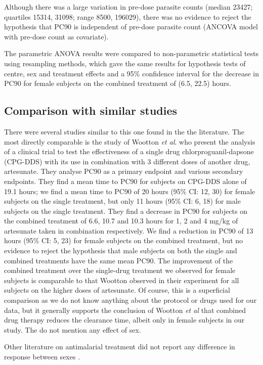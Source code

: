 Although there was a large variation in pre-dose parasite counts (median 23427; quartiles 15314, 31098; range 8500, 196029), there was no evidence to reject the hypothesis that PC90 is independent of pre-dose parasite count (ANCOVA model with pre-dose count as covariate).

The parametric ANOVA results were compared to non-parametric statistical tests using resampling methods, which gave the same results for hypothesis tests of centre, sex and treatment effects and a 95\% confidence interval for the decrease in PC90 for female subjects on the combined treatment of (6.5, 22.5) hours.

\subsection{Comparison with similar studies}
There were several studies similar to this one found in the the literature. The most directly comparable is the study of Wootton {\it et al}. \cite{wootton} who present the analysis of a clinical trial to test the effectiveness of a single drug chlorproguanil-dapsone (CPG-DDS) with its use in combination with 3 different doses of another drug, artesunate. They analyse PC90 as a primary endpoint and various secondary endpoints. They find a mean time to PC90 for subjects on CPG-DDS alone of 19.1 hours; we find a mean time to PC90 of 20 hours (95\% CI: 12, 30) for female subjects on the single treatment, but only 11 hours (95\% CI: 6, 18) for male subjects on the single treatment. They find a decrease in PC90 for subjects on the combined treatment of 6.6, 10.7 and 10.3 hours for 1, 2 and 4 mg/kg of artesunate taken in combination respectively. We find a reduction in PC90 of 13 hours (95\% CI: 5, 23) for female subjects on the combined treatment, but no evidence to reject the hypothesis that male subjects on both the single and combined treatments have the same mean PC90. The improvement of the combined treatment over the single-drug treatment we observed for female subjects is comparable to that Wootton observed in their experiment for all subjects on the higher doses of artesunate. Of course, this is a superficial comparison as we do not know anything about the protocol or drugs used for our data, but it generally supports the conclusion of Wootton {\it et al} that combined drug therapy reduces the clearance time, albeit only in female subjects in our study. The do not mention any effect of sex.

Other literature on antimalarial treatment did not report any difference in response between sexes \cite{carmello, newton, svensson, vries}.

